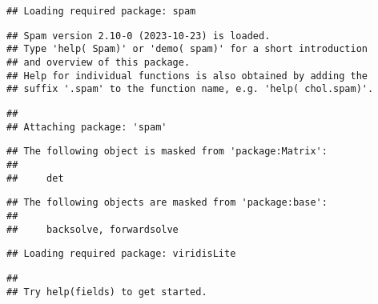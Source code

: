 \documentclass[
]{article}
\begin{document}
\begin{verbatim}
## Loading required package: spam
\end{verbatim}

\begin{verbatim}
## Spam version 2.10-0 (2023-10-23) is loaded.
## Type 'help( Spam)' or 'demo( spam)' for a short introduction 
## and overview of this package.
## Help for individual functions is also obtained by adding the
## suffix '.spam' to the function name, e.g. 'help( chol.spam)'.
\end{verbatim}

\begin{verbatim}
## 
## Attaching package: 'spam'
\end{verbatim}

\begin{verbatim}
## The following object is masked from 'package:Matrix':
## 
##     det
\end{verbatim}

\begin{verbatim}
## The following objects are masked from 'package:base':
## 
##     backsolve, forwardsolve
\end{verbatim}

\begin{verbatim}
## Loading required package: viridisLite
\end{verbatim}

\begin{verbatim}
## 
## Try help(fields) to get started.
\end{verbatim}
\end{document}
